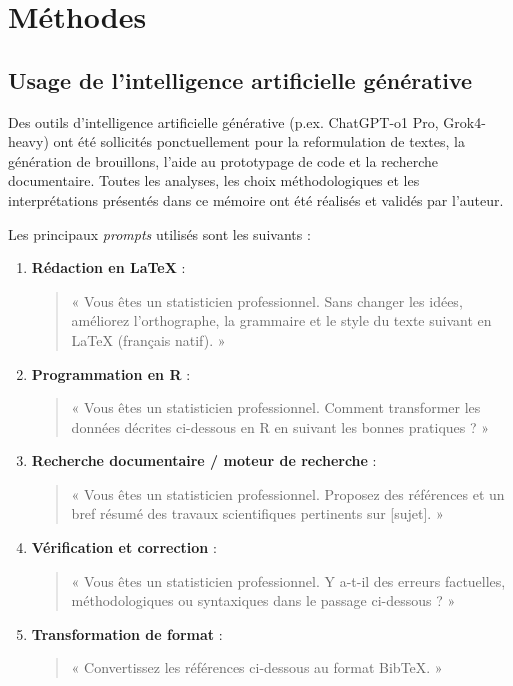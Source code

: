 \chapter{Méthodes}
\label{chap:methods}

\section{Usage de l'intelligence artificielle générative}
\label{sec:ia}

Des outils d'intelligence artificielle générative (p.ex. ChatGPT-o1 Pro, Grok4-heavy) ont été sollicités ponctuellement pour la reformulation de textes, la génération de brouillons, l'aide au prototypage de code et la recherche documentaire. Toutes les analyses, les choix méthodologiques et les interprétations présentés dans ce mémoire ont été réalisés et validés par l'auteur.

Les principaux \emph{prompts} utilisés sont les suivants :

\begin{enumerate}
	\item \textbf{Rédaction en \LaTeX{}} :
	\begin{quote}
		« Vous êtes un statisticien professionnel. Sans changer les idées, améliorez l'orthographe, la grammaire et le style du texte suivant en \LaTeX{} (français natif). »
	\end{quote}
	\item \textbf{Programmation en R} :
	\begin{quote}
		« Vous êtes un statisticien professionnel. Comment transformer les données décrites ci-dessous en R en suivant les bonnes pratiques ? »
	\end{quote}
	\item \textbf{Recherche documentaire / moteur de recherche} :
	\begin{quote}
		« Vous êtes un statisticien professionnel. Proposez des références et un bref résumé des travaux scientifiques pertinents sur [sujet]. »
	\end{quote}
	\item \textbf{Vérification et correction} :
	\begin{quote}
		« Vous êtes un statisticien professionnel. Y a-t-il des erreurs factuelles, méthodologiques ou syntaxiques dans le passage ci-dessous ? »
	\end{quote}
		\item \textbf{Transformation de format} :
	\begin{quote}
		« Convertissez les références ci-dessous au format BibTeX. »
	\end{quote}
\end{enumerate}

